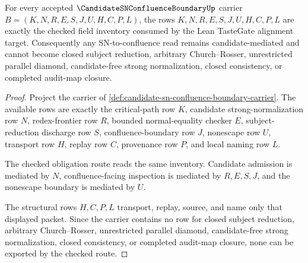 \begin{theorem}
\label{thm:candidate-sn-confluence-boundary-checked-obligation-route}
For every accepted $\CandidateSNConfluenceBoundaryUp$ carrier $B=(K,N,R,E,S,J,U,H,C,P,L)$, the rows $K,N,R,E,S,J,U,H,C,P,L$ are exactly the checked field inventory consumed by the Lean TasteGate alignment target. Consequently any SN-to-confluence read remains candidate-mediated and cannot become closed subject reduction, arbitrary Church--Rosser, unrestricted parallel diamond, candidate-free strong normalization, closed consistency, or completed audit-map closure.
\end{theorem}
\begin{proof}
Project the carrier of \autoref{def:candidate-sn-confluence-boundary-carrier}. The available rows are exactly the critical-path row $K$, candidate strong-normalization row $N$, redex-frontier row $R$, bounded normal-equality checker $E$, subject-reduction discharge row $S$, confluence-boundary row $J$, nonescape row $U$, transport row $H$, replay row $C$, provenance row $P$, and local naming row $L$.

The checked obligation route reads the same inventory. Candidate admission is mediated by $N$, confluence-facing inspection is mediated by $R,E,S,J$, and the nonescape boundary is mediated by $U$.

The structural rows $H,C,P,L$ transport, replay, source, and name only that displayed packet. Since the carrier contains no row for closed subject reduction, arbitrary Church--Rosser, unrestricted parallel diamond, candidate-free strong normalization, closed consistency, or completed audit-map closure, none can be exported by the checked route.
\end{proof}

